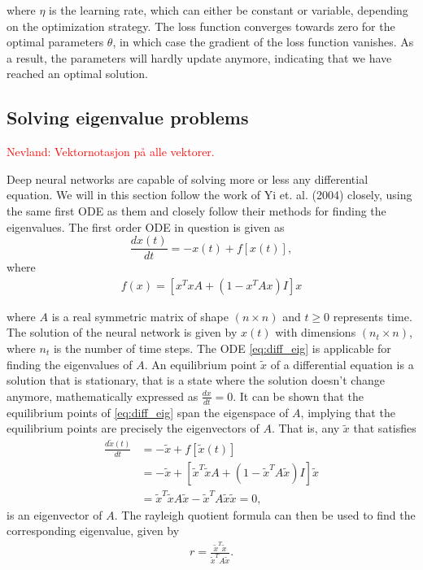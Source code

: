 \documentclass[12pt]{extarticle}
\begin{document}
where $\eta$ is the learning rate, which can either be constant or variable, depending on the optimization strategy.
The loss function converges towards zero for the optimal parameters $\theta$, in which case the gradient of the loss function vanishes. As a result, the parameters will hardly update anymore, indicating that we have reached an optimal solution.


\subsection{Solving eigenvalue problems}
\textcolor{red}{Nevland: Vektornotasjon på alle vektorer.}

Deep neural networks are capable of solving more or less any differential equation. We will in this section follow the work of Yi et. al. (2004) \cite{yi2004neural} closely, using the same first ODE as them and closely follow their methods for finding the eigenvalues. The first order ODE in question is given as     
\begin{equation}
	\frac{dx(t)}{dt} = -x(t) + f[x(t)],
	\label{eq:diff_eig}
\end{equation}
where
\begin{align}
	f(x) = [x^TxA + (1 - x^TAx)I]x
\end{align}

where $A$ is a real symmetric matrix of shape $(n\times n)$ and $t \ge 0$ represents time. The solution of the neural network is given by $x(t)$ with dimensions $(n_t\times n)$, where $n_t$ is the number of time steps. The ODE \eqref{eq:diff_eig} is applicable for finding the eigenvalues of $A$. An equilibrium point $\tilde{x}$ of a differential equation is a solution that is stationary, that is a state where the solution doesn't change anymore, mathematically expressed as $\frac{dx}{dt} = 0$. It can be shown that the equilibrium points of \eqref{eq:diff_eig} span the eigenspace of $A$, implying that the equilibrium points are precisely the eigenvectors of $A$. That is, any $\tilde{x}$ that satisfies
\begin{align}
	\frac{d\tilde{x}(t)}{dt} &= -\tilde{x} + f[\tilde{x}(t)] \nonumber \\
	&= -\tilde{x} + [\tilde{x}^T\tilde{x}A + (1 - \tilde{x}^TA\tilde{x})I]\tilde{x} \nonumber \\
	&= \tilde{x}^T\tilde{x}A\tilde{x} - \tilde{x}^TA\tilde{x}\tilde{x} = 0,
\end{align}
is an eigenvector of $A$. The rayleigh quotient formula can then be used to find the corresponding eigenvalue, given by
\begin{align} \label{eq:rayleigh_quotient}
	r = \frac{\tilde{x}^T\tilde{x}}{\tilde{x}^T A \tilde{x}}.
\end{align}
\end{document}
